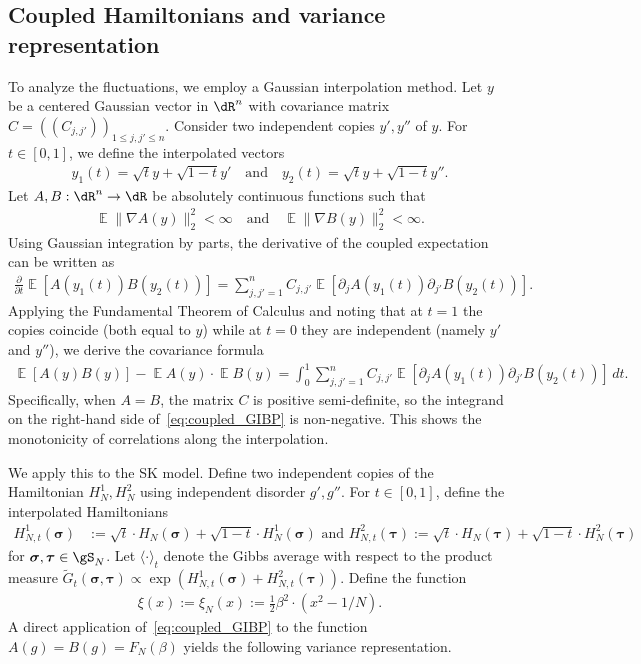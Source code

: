 \documentclass[letterpaper,11pt,reqno]{amsart}
\renewcommand{\le}{\leqslant}
\newcommand{\ra}{\rangle}
\newcommand{\la}{\langle}
\newcommand{\mvgs}{\boldsymbol{\sigma}}\newcommand{\mvgS}{\boldsymbol{\Sigma}}\newcommand{\mvgt}{\boldsymbol{\tau}}
\DeclareMathOperator{\E}{\mathds{E}}
\begin{document}
\subsection{Coupled Hamiltonians and variance representation}\label{sec:cham}
To analyze the fluctuations, we employ a Gaussian interpolation method.
Let \(y\) be a centered Gaussian vector in \(\dR^n\) with covariance matrix \(C = ((C_{j,j'}))_{1 \le j,j' \le n}\). Consider two independent copies \(y', y''\) of \(y\). For \(t \in [0,1]\), we define the interpolated vectors
\begin{align*}
    y_1 (t) = \sqrt{t}y + \sqrt{1-t} y' \quad \text{and} \quad y_2 (t) = \sqrt{t}y + \sqrt{1-t} y''.
\end{align*}
Let \(A, B: \dR^n \to \dR\) be absolutely continuous functions such that
\begin{align*}
    \E \|\nabla A(y)\|_2^2 < \infty \quad \text{and} \quad \E \|\nabla B(y)\|_2^2 < \infty.
\end{align*}
Using Gaussian integration by parts, the derivative of the coupled expectation can be written as 
\begin{align*}
    \frac{\partial}{\partial t} \E [A(y_1 (t)) B(y_2 (t))] = \sum_{j, j'=1}^n C_{j,j'} \E [\partial_{j} A(y_1 (t)) \partial_{j'} B(y_2 (t))].
\end{align*}
Applying the Fundamental Theorem of Calculus and noting that at $t=1$ the copies coincide (both equal to $y$) while at $t=0$ they are independent (namely $y'$ and $y''$), we derive the covariance formula
\begin{align}
    \E [A(y) B(y)] - \E A(y)\cdot  \E B(y)
    = \int_0^1 \sum_{j, j'=1}^n C_{j,j'} \E [\partial_{j} A(y_1 (t)) \partial_{j'} B(y_2 (t))] \, dt. 
    \label{eq:coupled_GIBP}
\end{align}
Specifically, when $A=B$, the matrix $C$ is positive semi-definite, so the integrand on the right-hand side of~\eqref{eq:coupled_GIBP} is non-negative. This shows the monotonicity of correlations along the interpolation.

We apply this to the SK model. Define two independent copies of the Hamiltonian $H_N^1, H_N^2$ using independent disorder $g', g''$. For $t \in [0,1]$, define the interpolated Hamiltonians
\begin{align*}
    H_{N,t}^1 (\mvgs) &:= \sqrt{t}\cdot H_N (\mvgs) + \sqrt{1-t} \cdot H_N^1 (\mvgs) \text{ and }
    H_{N,t}^2 (\mvgt) := \sqrt{t}\cdot H_N (\mvgt) + \sqrt{1-t}\cdot H_N^2 (\mvgt)
\end{align*}
for $\mvgs,\mvgt\in\gS_N$.
Let $\la \cdot \ra_t$ denote the Gibbs average with respect to the product measure $\tilde{G}_t(\mvgs, \mvgt) \propto \exp(H_{N,t}^1(\mvgs) + H_{N,t}^2(\mvgt))$.
Define the function
\begin{align*}
\xi(x) := \xi_N (x) := \frac{1}{2} \beta^2\cdot \left(x^2 - 1/N\right). 
\end{align*}
A direct application of~\eqref{eq:coupled_GIBP} to the function $A(g) = B(g) = F_N(\beta)$ yields the following variance representation.
\end{document}
